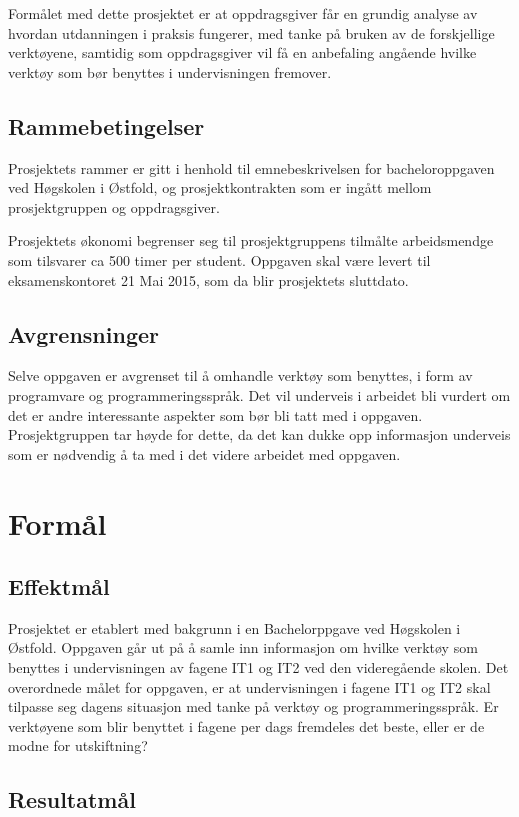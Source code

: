 \documentclass[norsk,a4paper,12pt]{article}
\begin{document}
Formålet med dette prosjektet er at oppdragsgiver får en grundig analyse av hvordan  utdanningen i praksis fungerer, med tanke på bruken av de forskjellige verktøyene, samtidig som oppdragsgiver vil få en anbefaling angående hvilke verktøy som bør benyttes i undervisningen fremover.

\subsection{Rammebetingelser}

Prosjektets rammer er gitt i henhold til emnebeskrivelsen for bacheloroppgaven ved Høgskolen i Østfold, og prosjektkontrakten som er ingått mellom prosjektgruppen og oppdragsgiver. 

Prosjektets økonomi begrenser seg til prosjektgruppens tilmålte arbeidsmendge som tilsvarer ca 500 timer per student. Oppgaven skal være levert til eksamenskontoret 21 Mai 2015, som da blir prosjektets sluttdato. 

\subsection{Avgrensninger}

Selve oppgaven er avgrenset til å omhandle verktøy som benyttes, i form av programvare og programmeringsspråk. Det vil underveis i arbeidet  bli vurdert om det er andre interessante aspekter som bør bli tatt med i oppgaven. Prosjektgruppen tar høyde for dette, da det kan dukke opp informasjon underveis som er nødvendig å ta med i det videre arbeidet med oppgaven.
\section{Formål}

\subsection{Effektmål}

Prosjektet er etablert med bakgrunn i en Bachelorppgave ved Høgskolen i Østfold. Oppgaven går ut på å samle inn informasjon om hvilke verktøy som benyttes i undervisningen av fagene IT1 og IT2 ved den videregående skolen. Det overordnede målet for oppgaven, er at undervisningen i fagene IT1 og IT2 skal tilpasse seg dagens situasjon med tanke på verktøy og programmeringsspråk. Er verktøyene som blir benyttet i fagene per dags fremdeles det beste, eller er de modne for utskiftning? 

\subsection{Resultatmål}
\end{document}
